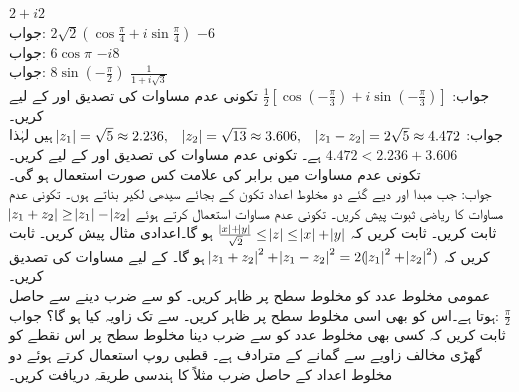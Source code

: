 \quad
$2+i2$\\
جواب:\quad
$2\sqrt{2}(\cos \frac{\pi}{4}+i\sin\frac{\pi}{4})$
\quad
$-6$\\
جواب:\quad
$6\cos \pi$
\quad
$-i8$\\
جواب:\quad
$8\sin (-\tfrac{\pi}{2})$
\quad
$\tfrac{1}{1+i\sqrt{3}}$\\
جواب:\quad
$\tfrac{1}{2}[\cos(-\tfrac{\pi}{3})+i\sin(-\tfrac{\pi}{3})]$
\quad
تکونی عدم مساوات کی تصدیق  اور  کے لیے کریں۔\\
جواب:\quad
$\abs{z_1}=\sqrt{5}\approx 2.236,\quad \abs{z_2}=\sqrt{13}\approx 3.606,\quad \abs{z_1-z_2}=2\sqrt{5}\approx 4.472$
ہیں لہٰذا 
$4.472<2.236+3.606$
ہے۔
\quad
تکونی عدم مساوات کی تصدیق  اور  کے لیے کریں۔\\
\quad
تکونی عدم مساوات میں برابر کی علامت کس صورت استعمال ہو گی۔\\
جواب:\quad
جب مبدا اور دیے گئے دو مخلوط اعداد تکون کے بجائے سیدھی لکیر بناتے ہوں۔
\quad
تکونی عدم مساوات کا ریاضی ثبوت پیش کریں۔
\quad
تکونی عدم مساوات استعمال کرتے ہوئے 
$\abs{z_1+z_2}\ge \abs{z_1}-\abs{z_2}$
ثابت کریں۔
\quad
ثابت کریں کہ 
$\tfrac{\abs{x}+\abs{y}}{\sqrt{2}}\le \abs{z}\le \abs{x}+\abs{y}$
ہو گا۔اعدادی مثال پیش کریں۔
\quad
ثابت کریں کہ
$\abs{z_1+z_2}^2+\abs{z_1-z_2}^2=2(\abs{z_1}^2+\abs{z_2}^2)$
ہو گا۔
\quad
{} کے لیے مساوات  کی تصدیق کریں۔
\quad {}\\
عمومی مخلوط عدد  کو مخلوط سطح پر ظاہر کریں۔ کو  سے ضرب دینے سے  حاصل ہوتا ہے۔اس کو بھی اسی مخلوط سطح پر ظاہر کریں۔ سے  تک زاویہ کیا ہو گا؟ 
جواب:\quad 
$\tfrac{\pi}{2}$
\quad {}\\
ثابت کریں کہ کسی بھی مخلوط عدد کو  سے ضرب دینا  مخلوط سطح پر اس نقطے کو گھڑی مخالف   زاویے سے  گمانے کے مترادف ہے۔
\quad
قطبی روپ استعمال کرتے ہوئے دو مخلوط اعداد  کے حاصل ضرب  مثلاً  کا ہندسی طریقہ دریافت کریں۔ 

